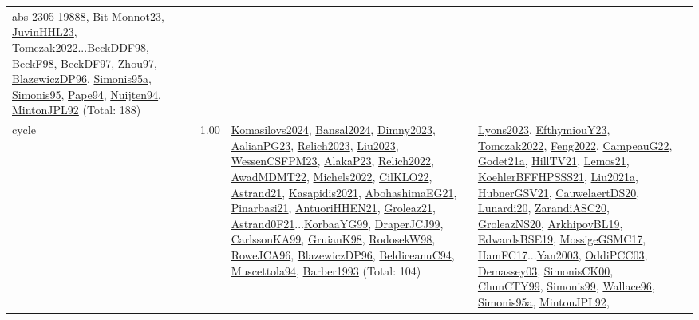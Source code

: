 {\begin{longtable}{p{3cm}r>{\raggedright\arraybackslash}p{6cm}>{\raggedright\arraybackslash}p{6cm}>{\raggedright\arraybackslash}p{8cm}}
\hyperref[detail:abs-2305-19888]{abs-2305-19888}, \hyperref[detail:Bit-Monnot23]{Bit-Monnot23}, \hyperref[detail:JuvinHHL23]{JuvinHHL23}, \hyperref[detail:Tomczak2022]{Tomczak2022}...\hyperref[detail:BeckDDF98]{BeckDDF98}, \hyperref[detail:BeckF98]{BeckF98}, \hyperref[detail:BeckDF97]{BeckDF97}, \hyperref[detail:Zhou97]{Zhou97}, \hyperref[detail:BlazewiczDP96]{BlazewiczDP96}, \hyperref[detail:Simonis95a]{Simonis95a}, \hyperref[detail:Simonis95]{Simonis95}, \hyperref[detail:Pape94]{Pape94}, \hyperref[detail:Nuijten94]{Nuijten94}, \hyperref[detail:MintonJPL92]{MintonJPL92} (Total: 188)\\
\index{cycle}\index{Constraints!cycle}cycle &  1.00 & \hyperref[detail:Komasilovs2024]{Komasilovs2024}, \hyperref[detail:Bansal2024]{Bansal2024}, \hyperref[detail:Dimny2023]{Dimny2023}, \hyperref[detail:AalianPG23]{AalianPG23}, \hyperref[detail:Relich2023]{Relich2023}, \hyperref[detail:Liu2023]{Liu2023}, \hyperref[detail:WessenCSFPM23]{WessenCSFPM23}, \hyperref[detail:AlakaP23]{AlakaP23}, \hyperref[detail:Relich2022]{Relich2022}, \hyperref[detail:AwadMDMT22]{AwadMDMT22}, \hyperref[detail:Michels2022]{Michels2022}, \hyperref[detail:CilKLO22]{CilKLO22}, \hyperref[detail:Astrand21]{Astrand21}, \hyperref[detail:Kasapidis2021]{Kasapidis2021}, \hyperref[detail:AbohashimaEG21]{AbohashimaEG21}, \hyperref[detail:Pinarbasi21]{Pinarbasi21}, \hyperref[detail:AntuoriHHEN21]{AntuoriHHEN21}, \hyperref[detail:Groleaz21]{Groleaz21}, \hyperref[detail:Astrand0F21]{Astrand0F21}...\hyperref[detail:KorbaaYG99]{KorbaaYG99}, \hyperref[detail:DraperJCJ99]{DraperJCJ99}, \hyperref[detail:CarlssonKA99]{CarlssonKA99}, \hyperref[detail:GruianK98]{GruianK98}, \hyperref[detail:RodosekW98]{RodosekW98}, \hyperref[detail:RoweJCA96]{RoweJCA96}, \hyperref[detail:BlazewiczDP96]{BlazewiczDP96}, \hyperref[detail:BeldiceanuC94]{BeldiceanuC94}, \hyperref[detail:Muscettola94]{Muscettola94}, \hyperref[detail:Barber1993]{Barber1993} (Total: 104) & \hyperref[detail:Lyons2023]{Lyons2023}, \hyperref[detail:EfthymiouY23]{EfthymiouY23}, \hyperref[detail:Tomczak2022]{Tomczak2022}, \hyperref[detail:Feng2022]{Feng2022}, \hyperref[detail:CampeauG22]{CampeauG22}, \hyperref[detail:Godet21a]{Godet21a}, \hyperref[detail:HillTV21]{HillTV21}, \hyperref[detail:Lemos21]{Lemos21}, \hyperref[detail:KoehlerBFFHPSSS21]{KoehlerBFFHPSSS21}, \hyperref[detail:Liu2021a]{Liu2021a}, \hyperref[detail:HubnerGSV21]{HubnerGSV21}, \hyperref[detail:CauwelaertDS20]{CauwelaertDS20}, \hyperref[detail:Lunardi20]{Lunardi20}, \hyperref[detail:ZarandiASC20]{ZarandiASC20}, \hyperref[detail:GroleazNS20]{GroleazNS20}, \hyperref[detail:ArkhipovBL19]{ArkhipovBL19}, \hyperref[detail:EdwardsBSE19]{EdwardsBSE19}, \hyperref[detail:MossigeGSMC17]{MossigeGSMC17}, \hyperref[detail:HamFC17]{HamFC17}...\hyperref[detail:Yan2003]{Yan2003}, \hyperref[detail:OddiPCC03]{OddiPCC03}, \hyperref[detail:Demassey03]{Demassey03}, \hyperref[detail:SimonisCK00]{SimonisCK00}, \hyperref[detail:ChunCTY99]{ChunCTY99}, \hyperref[detail:Simonis99]{Simonis99}, \hyperref[detail:Wallace96]{Wallace96}, \hyperref[detail:Simonis95a]{Simonis95a}, \hyperref[detail:MintonJPL92]{MintonJPL92}, 
\end{longtable}}
